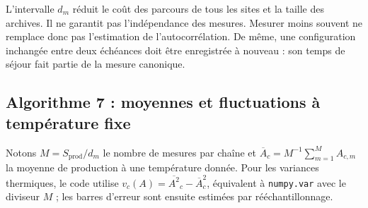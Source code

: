 \documentclass[10pt,a4paper]{article}
\begin{document}
L'intervalle $d_m$ réduit le coût des parcours de tous les sites et la taille
des archives. Il ne garantit pas l'indépendance des mesures. Mesurer moins
souvent ne remplace donc pas l'estimation de l'autocorrélation. De même,
une configuration inchangée entre deux échéances doit être enregistrée à
nouveau : son temps de séjour fait partie de la mesure canonique.

\subsection{Algorithme 7 : moyennes et fluctuations à température fixe}
Notons $M=S_{\mathrm{prod}}/d_m$ le nombre de mesures par chaîne et
$\overline A_c=M^{-1}\sum_{m=1}^M A_{c,m}$ la moyenne de production à une
température donnée. Pour les variances thermiques, le code utilise
$v_c(A)=\overline{A^2}_c-\overline A_c^2$, équivalent à
\texttt{numpy.var} avec le diviseur $M$ ; les barres d'erreur sont ensuite
estimées par rééchantillonnage.
\end{document}
